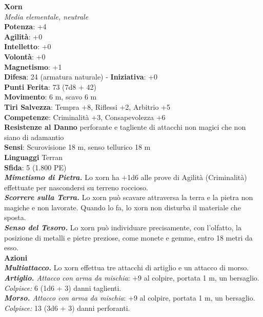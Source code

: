\begin{multicols}{2}
\medskip\textbf{Xorn}\\
\emph{Media elementale, neutrale}\\
\textbf{Potenza}: +4\\
\textbf{Agilità}: +0\\
\textbf{Intelletto}: +0\\
\textbf{Volontà}: +0\\
\textbf{Magnetismo}: +1\\
\textbf{Difesa}: 24 (armatura naturale) - \textbf{Iniziativa}: +0\\
\textbf{Punti Ferita}: 73 (7d8 + 42)\\
\textbf{Movimento}: 6 m, scavo 6 m\\
\textbf{Tiri Salvezza}: Tempra +8, Riflessi +2, Arbitrio +5\\
\textbf{Competenze}: Criminalità +3, Consapevolezza +6\\
\textbf{Resistenze al Danno} perforante e tagliente di attacchi non magici che non siano di adamantio\\
\textbf{Sensi}: Scurovisione 18 m, senso tellurico 18 m\\
\textbf{Linguaggi} Terran\\
\textbf{Sfida}: 5 (1.800 PE)\smallskip\\
\emph{\textbf{Mimetismo di Pietra.}} Lo xorn ha +1d6 alle prove di Agilità (Criminalità) effettuate per nascondersi su terreno roccioso.\\
\emph{\textbf{Scorrere sulla Terra.}} Lo xorn può scavare attraversa la terra e la pietra non magiche e non lavorate. Quando lo fa, lo xorn non disturba il materiale che sposta.\\
\emph{\textbf{Senso del Tesoro.}} Lo xorn può individuare precisamente, con l'olfatto, la posizione di metalli e pietre preziose, come monete e gemme, entro 18 metri da esso.\\
\smallskip\textbf{Azioni}\\
\emph{\textbf{Multiattacco.}} Lo xorn effettua tre attacchi di artiglio e un attacco di morso.\\
\emph{\textbf{Artiglio.} Attacco con arma da mischia}: +9 al colpire, portata 1 m, un bersaglio.\\
\emph{Colpisce:} 6 (1d6 + 3) danni taglienti.\\
\emph{\textbf{Morso.} Attacco con arma da mischia}: +9 al colpire, portata 1 m, un bersaglio.\\
\emph{Colpisce:} 13 (3d6 + 3) danni perforanti.\\

\end{multicols}

